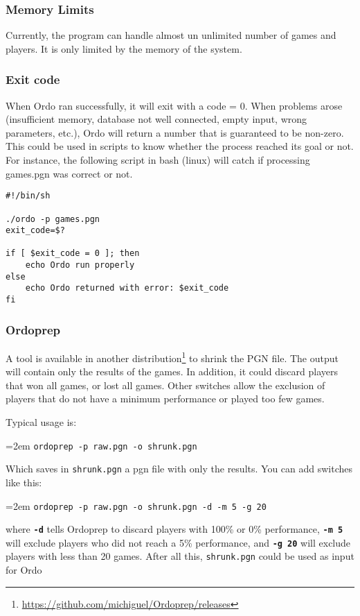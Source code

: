\documentclass[12pt]{article}
\newcommand{\swtch} [1] {\texttt{\textbf{#1}}}
\newcommand{\filename} [1] {\texttt{#1}}
\newcommand{\cmdln}[1]{
	\par
	\begingroup
		\leftskip=2em
		\addtolength{\rightskip}{0em}
		\noindent \small{\texttt{#1}}
		\par
	\endgroup
}
\begin{document}
\subsubsection*{Memory Limits}
Currently, the program can handle almost un unlimited number of games and players. It is only limited by the memory of the system.

\subsubsection*{Exit code}
When Ordo ran successfully, it will exit with a code = 0. 
When problems arose (insufficient memory, database not well connected, empty input, wrong parameters, etc.), Ordo will return a number that is guaranteed to be non-zero.
This could be used in scripts to know whether the process reached its goal or not.
For instance, the following script in bash (linux) will catch if processing games.pgn was correct or not.

\begin{verbatim}
#!/bin/sh

./ordo -p games.pgn
exit_code=$?

if [ $exit_code = 0 ]; then
    echo Ordo run properly
else
    echo Ordo returned with error: $exit_code
fi
\end{verbatim}

\subsubsection*{Ordoprep}
A tool is available in another distribution\footnote{\url{https://github.com/michiguel/Ordoprep/releases}} to shrink the PGN file.
The output will contain only the results of the games. 
In addition, it could discard players that won all games, or lost all games. 
Other switches allow the exclusion of players that do not have a minimum performance or played too few games.

Typical usage is:

\cmdln{ordoprep -p raw.pgn -o shrunk.pgn}

Which saves in \filename{shrunk.pgn} a pgn file with only the results. 
You can add switches like this:

\cmdln{ordoprep -p raw.pgn -o shrunk.pgn -d -m 5 -g 20}

where \swtch{-d} tells Ordoprep to discard players with 100\% or 0\% performance, \swtch{-m~5}
will exclude players who did not reach a 5\% performance, and \swtch{-g~20} will exclude players with less than 20 games.
After all this, \filename{shrunk.pgn} could be used as input for Ordo
\end{document}
